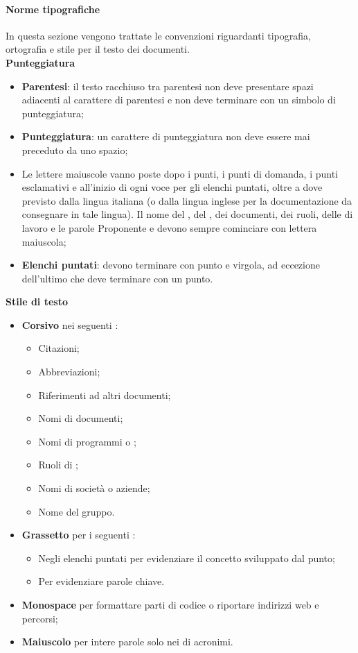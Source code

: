 \paragraph*{Norme tipografiche}
In questa sezione vengono trattate le convenzioni riguardanti tipografia, ortografia e stile per il testo dei documenti. \\
\textbf{Punteggiatura} \\
\begin{itemize}
\item \textbf{Parentesi}: il testo racchiuso tra parentesi non deve presentare spazi adiacenti al carattere di parentesi e non deve terminare con un simbolo di punteggiatura;
\item \textbf{Punteggiatura}: un carattere di punteggiatura non deve essere mai preceduto da uno spazio;
\item Le lettere maiuscole vanno poste dopo i punti, i punti di domanda, i punti esclamativi e all'inizio di ogni voce per gli elenchi puntati, oltre a dove previsto dalla lingua italiana (o dalla lingua inglese per la documentazione da consegnare in tale lingua). Il nome del , del , dei documenti, dei ruoli, delle  di lavoro e le parole Proponente e  devono sempre cominciare con lettera maiuscola;
  \item \textbf{Elenchi puntati}: devono terminare con punto e virgola, ad eccezione dell'ultimo che deve terminare con un punto.
\end{itemize}

\textbf{Stile di testo} \\
\begin{itemize}
\item \textbf{Corsivo}  nei seguenti :
  \begin{itemize}
  \item Citazioni;
  \item Abbreviazioni;
  \item Riferimenti ad altri documenti;
  \item Nomi di documenti;
  \item Nomi di programmi o ;
  \item Ruoli di ;
  \item Nomi di societ\`a o aziende;
  \item Nome del gruppo.
  \end{itemize}
\item \textbf{Grassetto} per i seguenti :
  \begin{itemize}
  \item Negli elenchi puntati per evidenziare il concetto sviluppato dal punto;
  \item Per evidenziare parole chiave.
  \end{itemize}
\item \textbf{Monospace} per formattare parti di codice o riportare indirizzi web e percorsi;
\item \textbf{Maiuscolo} per intere parole solo nei  di acronimi.
\end{itemize}

